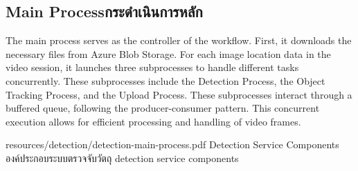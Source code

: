 \subsection{\ifenglish Main Process\else กระดำเนินการหลัก\fi}
The main process serves as the controller of the workflow. First, it downloads the necessary files from Azure Blob Storage. For each image location data in the video session, it launches three subprocesses to handle different tasks concurrently. These subprocesses include the Detection Process, the Object Tracking Process, and the Upload Process. These subprocesses interact through a buffered queue, following the producer-consumer pattern. This concurrent execution allows for efficient processing and handling of video frames.

\insertPDFfigure
{resources/detection/detection-main-process.pdf}
{\ifenglish Detection Service Components \else องค์ประกอบระบบตรวจจับวัตถุ\fi}
{detection service components}
